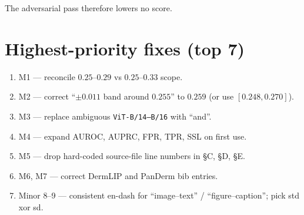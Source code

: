 \documentclass[11pt,a4paper]{article}
\begin{document}
The adversarial pass therefore lowers no score.

\section{Highest-priority fixes (top 7)}

\begin{enumerate}[leftmargin=2em]
\item M1 --- reconcile $0.25$--$0.29$ vs $0.25$--$0.33$ scope.
\item M2 --- correct ``$\pm 0.011$ band around $0.255$'' to $0.259$
      (or use $[0.248, 0.270]$).
\item M3 --- replace ambiguous \texttt{ViT-B/14--B/16} with ``and''.
\item M4 --- expand AUROC, AUPRC, FPR, TPR, SSL on first use.
\item M5 --- drop hard-coded source-file line numbers in \S C, \S D, \S E.
\item M6, M7 --- correct DermLIP and PanDerm bib entries.
\item Minor 8--9 --- consistent en-dash for ``image--text'' /
      ``figure--caption''; pick std xor sd.
\end{enumerate}
\end{document}
